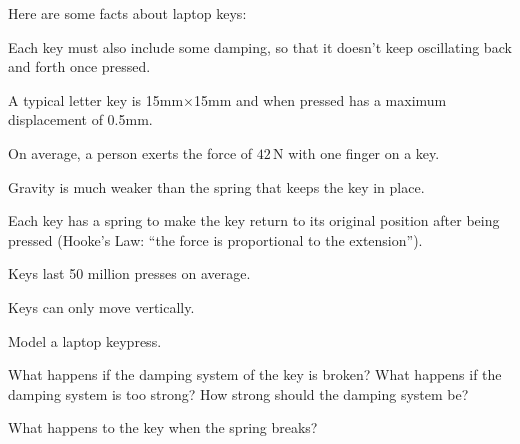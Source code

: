 \question
	Here are some facts about laptop keys:

\begin{itemize}
\begin{minipage}{.4\textwidth}
\item[\color{Gray}(da)] Each key must also include some damping, so that it doesn't keep oscillating back and forth once pressed.

\item[\color{Gray}(di)] A typical letter key is 15mm$\times$15mm and when pressed has a maximum displacement of 0.5mm.

\item[\color{Gray}(fo)] On average, a person exerts the force of $42\,$N with one finger on a key.
\end{minipage}
\hfill
\begin{minipage}{.4\textwidth}
\item[\color{Gray}(gr)] Gravity is much weaker than the spring that keeps the key in place.

\item[\color{Gray}(hl)] Each key has a spring to make the key return to its original position after being pressed (Hooke's Law: ``the force is proportional to the extension'').

\item[\color{Gray}(lo)] Keys last 50 million presses on average.

\item[\color{Gray}(ve)] Keys can only move vertically.
\end{minipage}
\end{itemize}
	
	
\begin{parts}
	\item Model a laptop keypress.
	\item What happens if the damping system of the key is broken? What happens if the damping system is too strong? How strong should the damping system be?
	\item What happens to the key when the spring breaks?
\end{parts}







\standardonlynewpage

%
%



